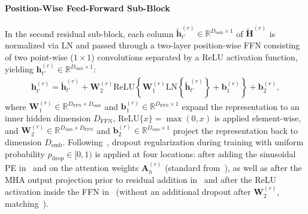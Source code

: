 \documentclass[lettersize,journal]{IEEEtran}
\begin{document}
\paragraph{Position-Wise Feed-Forward Sub-Block}
In the second residual sub-block, each column $\tilde{\mathbf{h}}_{t'}^{(r)} \in \mathbb{R}^{D_{\mathrm{emb}} \times 1}$ of $\widetilde{\mathbf{H}}^{(r)}$ is normalized via \gls{LN} and passed through a two-layer position-wise \gls{FFN} consisting of two point-wise ($1 \times 1$) convolutions separated by a \gls{ReLU} activation function, yielding $\mathbf{h}_{t'}^{(r)} \in \mathbb{R}^{D_{\mathrm{emb}} \times 1}$:
\begin{align}
  \mathbf{h}_{t'}^{(r)} = \tilde{\mathbf{h}}_{t'}^{(r)} + \mathbf{W}_2^{(r)} \mathrm{ReLU}\!\left\{ \mathbf{W}_1^{(r)} \mathrm{LN}\!\left\{\tilde{\mathbf{h}}_{t'}^{(r)}\right\} + \mathbf{b}_1^{(r)} \right\} + \mathbf{b}_2^{(r)},
  \label{eq:ffn_residual}
\end{align}
where $\mathbf{W}_1^{(r)} \in \mathbb{R}^{D_{\mathrm{FFN}} \times D_{\mathrm{emb}}}$ and $\mathbf{b}_1^{(r)} \in \mathbb{R}^{D_{\mathrm{FFN}} \times 1}$ expand the representation to an inner hidden dimension $D_{\mathrm{FFN}}$, $\mathrm{ReLU}\{x\} = \max(0, x)$ is applied element-wise, and $\mathbf{W}_2^{(r)} \in \mathbb{R}^{D_{\mathrm{emb}} \times D_{\mathrm{FFN}}}$ and $\mathbf{b}_2^{(r)} \in \mathbb{R}^{D_{\mathrm{emb}} \times 1}$ project the representation back to dimension $D_{\mathrm{emb}}$. Following~\cite{vaswani2017attention,cornell2022overlapped}, dropout regularization during training with uniform probability $p_{\mathrm{drop}} \in [0, 1)$ is applied at four locations: after adding the sinusoidal \gls{PE} in~ and on the attention weights $\mathbf{A}_h^{(r)}$ (standard from~\cite{vaswani2017attention}), as well as after the \gls{MHA} output projection prior to residual addition in~ and after the \gls{ReLU} activation inside the \gls{FFN} in~ (without an additional dropout after $\mathbf{W}_2^{(r)}$, matching~\cite{cornell2022overlapped}).
\end{document}
